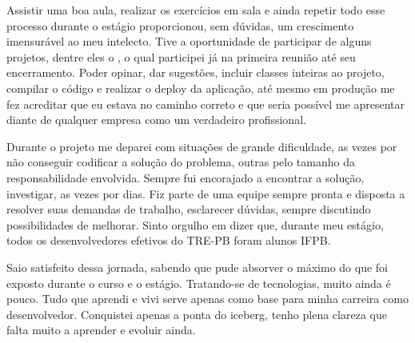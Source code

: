 Assistir uma boa aula, realizar os exercícios em sala e ainda repetir todo esse processo durante o estágio proporcionou, sem dúvidas, um crescimento imensurável ao meu intelecto. Tive a oportunidade de participar de alguns projetos, dentre eles o \imprimirtitulo \space, o qual participei já na primeira reunião até seu encerramento. Poder opinar, dar sugestões, incluir classes inteiras ao projeto, compilar o código e realizar o deploy da aplicação, até mesmo em produção me fez acreditar que eu estava no caminho correto e que seria possível me apresentar diante de qualquer empresa como um verdadeiro profissional.

Durante o projeto me deparei com situações de grande dificuldade, as vezes por não conseguir codificar a solução do problema, outras pelo tamanho da responsabilidade envolvida. Sempre fui encorajado a encontrar a solução, investigar, as vezes por dias.
Fiz parte de uma equipe sempre pronta e disposta a resolver suas demandas de trabalho, esclarecer dúvidas, sempre discutindo possibilidades de melhorar. Sinto orgulho em dizer que, durante meu estágio, todos os desenvolvedores efetivos do TRE-PB foram alunos IFPB.

Saio satisfeito dessa jornada, sabendo que pude absorver o máximo do que foi exposto durante o curso e o estágio. Tratando-se de tecnologias, muito ainda é pouco. Tudo que aprendi e vivi serve apenas como base para minha carreira como desenvolvedor. Conquistei apenas a ponta do iceberg, tenho plena clareza que falta muito a aprender e evoluir ainda. 